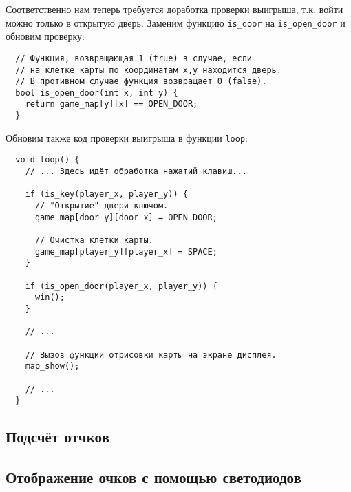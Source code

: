 \documentclass[../sparc.tex]{subfiles}
\begin{document}
Соответственно нам теперь требуется доработка проверки выигрыша, т.к. войти
можно только в открытую дверь.  Заменим функцию \texttt{is\_door} на
\texttt{is\_open\_door} и обновим проверку:

\begin{verbatim}
  // Функция, возвращающая 1 (true) в случае, если
  // на клетке карты по координатам x,y находится дверь.
  // В противном случае функция возвращает 0 (false).
  bool is_open_door(int x, int y) {
    return game_map[y][x] == OPEN_DOOR;
  }
\end{verbatim}

Обновим также код проверки выигрыша в функции \texttt{loop}:

\begin{verbatim}
  void loop() {
    // ... Здесь идёт обработка нажатий клавиш...

    if (is_key(player_x, player_y)) {
      // "Открытие" двери ключом.
      game_map[door_y][door_x] = OPEN_DOOR;

      // Очистка клетки карты.
      game_map[player_y][player_x] = SPACE;
    }

    if (is_open_door(player_x, player_y)) {
      win();
    }

    // ...

    // Вызов функции отрисовки карты на экране дисплея.
    map_show();

    // ...
  }
\end{verbatim}

\subsection{Подсчёт отчков}

\subsection{Отображение очков с помощью светодиодов}
\end{document}
